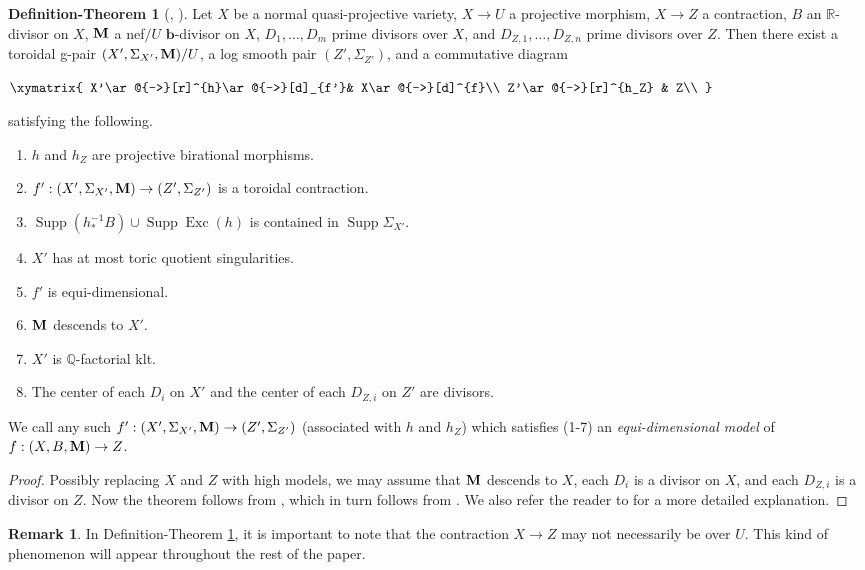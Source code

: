 \documentclass[11pt]{amsart}
\numberwithin{equation}{section}
\newcommand{\bb}{\bm{b}}
\newcommand{\Mm}{{\bf{M}}}
\newcommand{\Qq}{\mathbb{Q}}
\newcommand{\Rr}{\mathbb{R}}
\newcommand{\Exc}{\operatorname{Exc}}
\newcommand{\Supp}{\operatorname{Supp}}
\theoremstyle{definition}
\theoremstyle{definition}
\newtheorem{rem}[thm]{Remark}
\newtheorem{defthm}[thm]{Definition-Theorem}
\theoremstyle{definition}
\begin{document}
\begin{defthm}[{\cite[Definition-Theorem 6.5]{LLM23}, \cite[Theorem 2.2]{ACSS21}}]\label{defthm: weak ss reduction}
Let $X$ be a normal quasi-projective variety, $X\rightarrow U$ a projective morphism, $X\rightarrow Z$ a contraction, $B$ an $\Rr$-divisor on $X$, $\Mm$ a nef$/U$ $\bb$-divisor on $X$, $D_1,\dots,D_m$ prime divisors over $X$, and $D_{Z,1},\dots,D_{Z,n}$ prime divisors over $Z$. Then there exist a toroidal g-pair  $(X',\Sigma_{X'},\Mm)/U$, a log smooth pair $(Z',\Sigma_{Z'})$, and a commutative diagram
 \begin{center}$\xymatrix{
X'\ar@{->}[r]^{h}\ar@{->}[d]_{f'}& X\ar@{->}[d]^{f}\\
Z'\ar@{->}[r]^{h_Z} & Z\\
}$
\end{center}
satisfying the following.
\begin{enumerate}
\item $h$ and $h_Z$ are projective birational morphisms.
\item $f': (X',\Sigma_{X'},\Mm)\rightarrow (Z',\Sigma_{Z'})$ is a toroidal contraction.
\item $\Supp(h^{-1}_*B)\cup\Supp\Exc(h)$ is contained in $\Supp\Sigma_{X'}$.
\item $X'$ has at most toric quotient singularities.
\item $f'$ is equi-dimensional.
\item $\Mm$ descends to $X'$.
\item $X'$ is $\Qq$-factorial klt.
\item The center of each $D_i$ on $X'$ and the center of each $D_{Z,i}$ on $Z'$ are divisors.
\end{enumerate}
We call any such $f': (X',\Sigma_{X'},\Mm)\rightarrow (Z',\Sigma_{Z'})$ (associated with $h$ and $h_Z$) which satisfies (1-7) an \emph{equi-dimensional model} of $f: (X,B,\Mm)\rightarrow Z$. 
\end{defthm}
\begin{proof}
Possibly replacing $X$ and $Z$ with high models, we may assume that $\Mm$ descends to $X$, each $D_i$ is a divisor on $X$, and each $D_{Z,i}$ is a divisor on $Z$. Now the theorem follows from \cite[Theorem 2.2]{ACSS21}, which in turn follows from \cite[Theorem 2.1 and Proposition 4.4]{AK00}. We also refer the reader to \cite[Theorem B.6]{Hu20} for a more detailed explanation.
\end{proof}

\begin{rem}
In Definition-Theorem \ref{defthm: weak ss reduction}, it is important to note that the contraction $X\rightarrow Z$ may not necessarily be over $U$. This kind of phenomenon will appear throughout the rest of the paper.
\end{rem}
\end{document}
